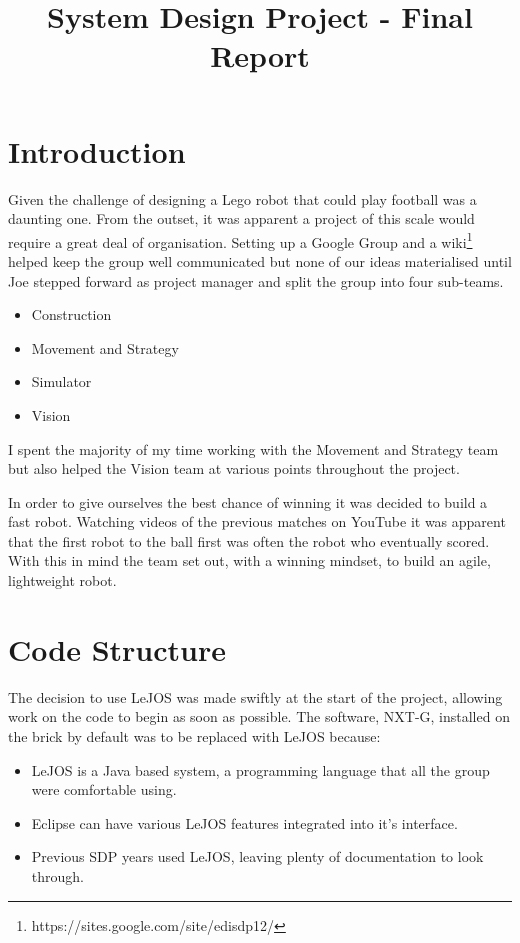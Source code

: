 \documentclass[conference,12pt]{IEEEtran}
\begin{document}
\title{\vspace{-0.05\textheight}System Design Project - Final Report}

\author{\vspace{-0.05\textheight}
}
	
\maketitle

\IEEEpeerreviewmaketitle

\section{Introduction}
Given the challenge of designing a Lego robot that could play football was a daunting one. From the outset, it was apparent a project of this scale would require a great deal of organisation. Setting up a Google Group and a wiki\footnote{https://sites.google.com/site/edisdp12/} helped keep the group well communicated but none of our ideas materialised until Joe stepped forward as project manager and split the group into four sub-teams.
\begin{itemize}
\item Construction
\item Movement and Strategy
\item Simulator
\item Vision
\end{itemize}
I spent the majority of my time working with the Movement and Strategy team but also helped the Vision team at various points throughout the project.

In order to give ourselves the best chance of winning it was decided to build a fast robot. Watching videos of the previous matches on YouTube it was apparent that the first robot to the ball first was often the robot who eventually scored. With this in mind the team set out, with a winning mindset, to build an agile, lightweight robot.

\section{Code Structure}
The decision to use LeJOS was made swiftly at the start of the project, allowing work on the code to begin as soon as possible. The software, NXT-G, installed on the brick by default was to be replaced with LeJOS because:
\begin{itemize}
\item LeJOS is a Java based system, a programming language that all the group were comfortable using.
\item Eclipse can have various LeJOS features integrated into it's interface.
\item Previous SDP years used LeJOS, leaving plenty of documentation to look through.
\end{itemize}
\end{document}
